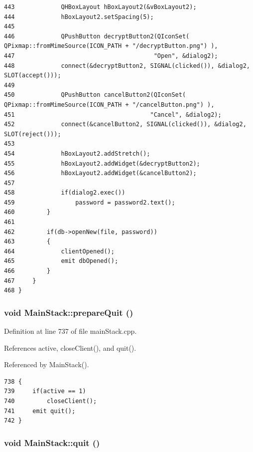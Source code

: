 \begin{verbatim}
443             QHBoxLayout hBoxLayout2(&vBoxLayout2);
444             hBoxLayout2.setSpacing(5);
445     
446             QPushButton decryptButton2(QIconSet( QPixmap::fromMimeSource(ICON_PATH + "/decryptButton.png") ),
447                                       "Open", &dialog2);
448             connect(&decryptButton2, SIGNAL(clicked()), &dialog2, SLOT(accept()));
449     
450             QPushButton cancelButton2(QIconSet( QPixmap::fromMimeSource(ICON_PATH + "/cancelButton.png") ),
451                                      "Cancel", &dialog2);
452             connect(&cancelButton2, SIGNAL(clicked()), &dialog2, SLOT(reject()));
453     
454             hBoxLayout2.addStretch();
455             hBoxLayout2.addWidget(&decryptButton2);
456             hBoxLayout2.addWidget(&cancelButton2);
457 
458             if(dialog2.exec())
459                 password = password2.text();
460         }
461 
462         if(db->openNew(file, password))
463         {
464             clientOpened();
465             emit dbOpened();
466         }
467     }
468 }
\end{verbatim}\normalsize 


\hypertarget{classMainStack_k9}{
\subsubsection[prepareQuit]{\setlength{\rightskip}{0pt plus 5cm}void Main\-Stack::prepare\-Quit ()}}
\label{classMainStack_k9}


Definition at line 737 of file main\-Stack.cpp.

References active, close\-Client(), and quit().

Referenced by Main\-Stack().

\footnotesize\begin{verbatim}738 {
739     if(active == 1)
740         closeClient();
741     emit quit();
742 }
\end{verbatim}\normalsize 


\hypertarget{classMainStack_l7}{
\subsubsection[quit]{\setlength{\rightskip}{0pt plus 5cm}void Main\-Stack::quit ()}}
\label{classMainStack_l7}




